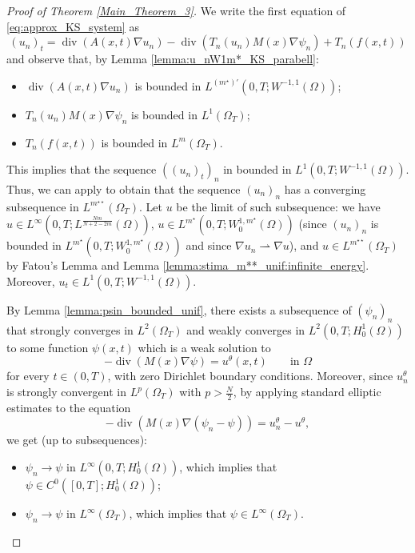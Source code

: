 \documentclass{amsart}
\numberwithin{equation}{section}
\def\elle#1{L^{#1}}
\def\elleom#1{L^{#1}(\Omega)}
\def\elleomT#1{L^{#1}(\Omega_T)}
\def\Sobom#1{W^{1,#1}_0(\Omega)}
\def\Hom{H^1_0(\Omega)}
\begin{document}
\begin{proof}[Proof of Theorem \ref{Main_Theorem_3}]
    We write the first equation of \eqref{eq:approx_KS_system} as
    $$(u_n)_t=\operatorname{div}(A(x, t) \nabla u_n)-\operatorname{div}(T_n(u_n) M(x) \nabla \psi_n)+T_n(f(x,t))$$
    and observe that, by Lemma \ref{lemma:u_nW1m*_KS_parabell}:
    \begin{itemize}
        \item $\operatorname{div}(A(x, t) \nabla u_n)$ is bounded in $\elle{({m^\star})'}(0,T;W^{-1,1}(\Omega))$;
        \item $T_n(u_n) M(x) \nabla \psi_n$ is bounded in $\elleomT1$;
        \item  $T_n(f(x,t))$ is bounded in $\elleomT m$.
    \end{itemize}
    This implies that the sequence $((u_n)_t)_n$ in bounded in $\elle1(0,T;W^{-1,1}(\Omega))$.
    Thus, we can apply \cite[Corollary 4]{Simon} to obtain that the sequence $(u_n)_n$ has a converging subsequence in $\elleomT {m^{\star\star}}$. Let $u$ be the limit of such subsequence: we have $u\in\elle\infty(0,T;\elleom{\frac{Nm}{N+2-2m}})$, $u\in\elle {m^\star}(0,T;\Sobom{m^\star})$ (since $(u_n)_n$ is bounded in $\elle {m^\star}(0,T;\Sobom{m^\star})$ and since $\nabla u_n\rightharpoonup\nabla u$), and $u\in\elleomT {m^{\star\star}}$ by Fatou's Lemma and Lemma \ref{lemma:stima_m**_unif:infinite_energy}. Moreover, $u_t\in \elle1(0,T;W^{-1,1}(\Omega))$.

    By Lemma \ref{lemma:psin_bounded_unif}, there exists a subsequence of $(\psi_n)_n$ that strongly converges in $\elleomT2$ and weakly converges in $\elle2(0,T;\Hom)$ to some function $\psi(x,t)$ which is a weak solution to
    \[
    -\operatorname{div}(M(x)\nabla\psi)=u^\theta(x,t)\qquad \text{in }\Omega
    \]
    for every $t\in (0,T)$, with zero Dirichlet boundary conditions.
    Moreover, since $u_n^\theta$ is strongly convergent in $\elleomT p$ with $p>\frac{N}{2}$, by applying standard elliptic estimates \cite{BoccardoCroce} to the equation
    \[
    -\operatorname{div}(M(x)\nabla(\psi_n-\psi))=u_n^\theta-u^\theta,
    \]
    we get (up to subsequences):
    \begin{itemize}
        \item $\psi_n\to\psi$ in $\elle\infty(0,T;\Hom)$, which implies that $\psi\in C^0([0,T];\Hom)$; 
        \item $\psi_n\to\psi$ in $\elle\infty(\Omega_T)$, which implies that $\psi\in \elle\infty(\Omega_T)$.
    \end{itemize}


\end{proof}
\end{document}
